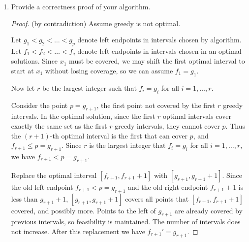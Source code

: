 \documentclass[12pt,a4paper]{article}
\theoremstyle{definition}
\begin{document}
\begin{enumerate}
\begin{enumerate}
\begin{algorithm}[H]
            $intervals \leftarrow []$\;
            $i \leftarrow 1$\;
            \textbf{output} $intervals$ and $|intervals|$\;
        \end{algorithm}
    \item Provide a correctness proof of your algorithm.
        \begin{proof}
            (by contradiction) Assume greedy is not optimal.  
            
            Let $g_1 < g_2 < \ldots < g_p$ denote left endpoints in intervals chosen by algorithm.
            Let $f_1 < f_2 < \ldots < f_q$ denote left endpoints in intervals chosen in an optimal solutions.
            Since \(x_1\) must be covered, we may shift the first optimal interval to start at \(x_1\) without losing coverage, so we can assume \(f_1 = g_1\).  
            
            Now let \(r\) be the largest integer such that \(f_i = g_i\) for all \(i = 1,\dots,r\).
            
            Consider the point \(p = g_{r+1}\), the first point not covered by the first \(r\) greedy intervals. In the optimal solution, since the first \(r\) optimal intervals cover exactly the same set as the first \(r\) greedy intervals, they cannot cover \(p\). Thus the \((r+1)\)-th optimal interval is the first that can cover \(p\), and \(f_{r+1} \le p = g_{r+1}\).  
            Since $r$ is the largest integer that \(f_i = g_i\) for all \(i = 1,\dots,r\), we have \(f_{r+1} < p = g_{r+1}\). 
            
            Replace the optimal interval \([f_{r+1}, f_{r+1}+1]\) with \([g_{r+1}, g_{r+1}+1]\). Since the old left endpoint \(f_{r+1} < p = g_{r+1}\) and the old right endpoint \(f_{r+1}+1\) is less than \(g_{r+1}+1\), \([g_{r+1}, g_{r+1}+1]\) covers all points that \([f_{r+1}, f_{r+1}+1]\) covered, and possibly more. Points to the left of \(g_{r+1}\) are already covered by previous intervals, so feasibility is maintained. The number of intervals does not increase. After this replacement we have \(f_{r+1}' = g_{r+1}\).  
            

\end{proof}
\end{enumerate}
\end{enumerate}
\end{document}

